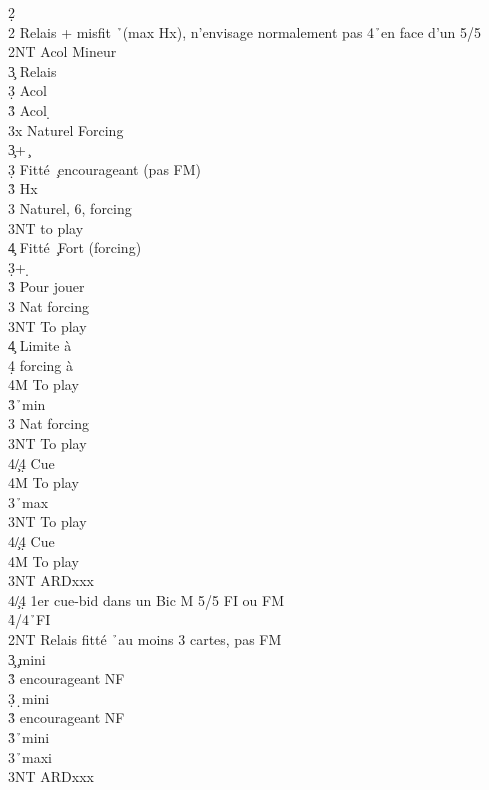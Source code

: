 \documentclass[a4paper]{article}
\begin{document}
\begin{bidtable}
2\d\+\\
2\s \> Relais + misfit \h\ (max Hx), n'envisage normalement pas 4\h\ en face d'un 5/5\+\\
2NT \> Acol Mineur\+\\
3\c \> Relais\+\\
3\d \> Acol \c \\
3\h \> Acol \d \-\\
3x \> Naturel Forcing\-\\
3\c {}+ \c \+\\
3\d \> Fitté \c\ encourageant (pas FM)\\
3\h \> Hx\\
3\s \> Naturel, 6\s , forcing\\
3NT \> to play\\
4\c \> Fitté \c\ Fort (forcing)\-\\
3\d {}+ \d \+\\
3\h \> Pour jouer\\
3\s \> Nat forcing\\
3NT \> To play\\
4\c \> Limite à \d \\
4\d \> forcing à \d \\
4M \> To play\-\\
3\h {}\h\ min\+\\
3\s \> Nat forcing\\
3NT \> To play\\
4\c/4\d \> Cue \h \\
4M \> To play\-\\
3\s {}\h\ max\+\\
3NT \> To play\\
4\c/4\d \> Cue \h \\
4M \> To play\-\\
3NT \> ARDxxx \h \\
4\c/4\d \> 1er cue-bid dans un Bic M 5/5 FI ou FM\\
4\h {}\s /4\h\ FI\-\\
2NT \> Relais fitté \h\ au moins 3 cartes, pas FM\+\\
3\c {}\c\ mini\+\\
3\h \> encourageant NF\-\\
3\d {}\d\ mini\+\\
3\h \> encourageant NF\-\\
3\h {}\h\ mini\\
3\s {}\h\ maxi\\
3NT \> ARDxxx \h \\

\end{bidtable}
\end{document}
